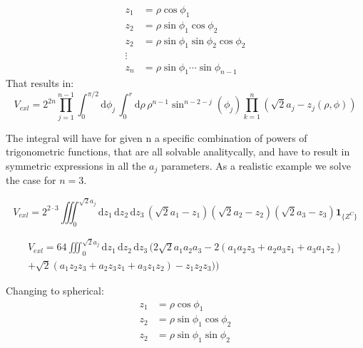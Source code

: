 \documentclass[superscriptaddress,pre,reprint,showpacs,onecolumn]{revtex4-1}
\newcommand{\rd}[1]{\mathrm{d}{#1} \,}
\newcommand{\indicatorsymbol}{\mathbf{1}}
\newcommand{\indicator}[1]{\indicatorsymbol_{ \{   #1 \} } }
\begin{document}
\begin{equation}
  \begin{split}
    z_1 & =\rho \cos \phi_1 \\
    z_2 & =\rho \sin \phi_1 \cos \phi_2 \\
     z_2 & =\rho \sin \phi_1 \sin \phi_2 \cos \phi_2 \\
    \vdots & \\
    z_n & = \rho \sin \phi_1 \cdots \sin \phi_{n-1}
  \end{split}
\end{equation}
That results in:
\begin{equation}
  V_{exl}=2^{2n} \prod_{j=1}^{n-1} \int_0^{\pi/2} \rd{\phi_j}
  \int_0^r \rd{\rho} \rho^{n-1} \sin^{n-2-j}(\phi_j)
  \prod_{k=1}^n (\sqrt{2}a_j -z_j(\rho, \phi)) 
\end{equation}

The integral will have for given n a specific combination of powers
of trigonometric functions, that are all solvable analitycally, and have
to result in symmetric expressions in all the $a_j$ parameters. As
a realistic example we solve the case for $n=3$.

\begin{equation}
  V_{exl}=2^{2\cdot 3} \iiint_0^ {\sqrt{2} a_j} \rd{z_1} \rd{z_2}  \rd{z_3} 
  (\sqrt{2}a_1 -z_1)(\sqrt{2}a_2 -z_2)(\sqrt{2}a_3-z_3) \indicator{Z^C}
\end{equation}

\begin{multline}
  V_{exl} = 64 \iiint_0^ {\sqrt{2} a_j} \rd{z_1} \rd{z_2}  \rd{z_3} 
  \bigg( 2\sqrt{2}a_1 a_2 a_3
  -2(a_1 a_2 z_3 +a_2 a_3 z_1 +a_3 a_1 z_2) \\
   +\sqrt{2}(a_1 z_2 z_3+a_2 z_3 z_1+a_3 z_1 z_2)
   -z_1 z _2 z_3 )
  \bigg)
\end{multline}

Changing to spherical:
\begin{equation}
  \begin{split}
    z_1 & =\rho \cos \phi_1 \\
    z_2 & =\rho \sin \phi_1 \cos \phi_2 \\
     z_2 & =\rho \sin \phi_1 \sin \phi_2 
  \end{split}
\end{equation}
\end{document}
